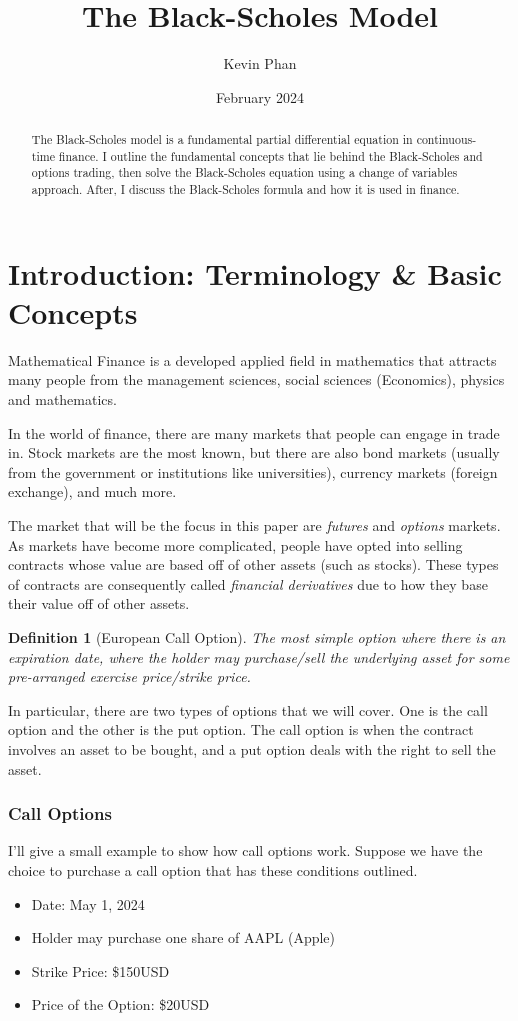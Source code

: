 \documentclass{article}
\title{The Black-Scholes Model}
\author{Kevin Phan}
\date{February 2024}
\newtheorem{definition}{Definition}[section]
\begin{document}
\maketitle

\begin{abstract}
    The Black-Scholes model is a fundamental partial differential equation in 
    continuous-time finance. I outline the fundamental concepts that lie behind the Black-Scholes and options trading, 
    then solve the Black-Scholes equation using a change of variables approach.
    After, I discuss the Black-Scholes formula and how it is used in finance. 
\end{abstract}

\section{Introduction: Terminology \& Basic Concepts}

Mathematical Finance is a developed applied field in mathematics that attracts many people from the management sciences, social sciences (Economics), physics and mathematics.

In the world of finance, there are many markets that people can engage in trade in. Stock markets are the most known, 
but there are also bond markets (usually from the government or institutions like universities), currency markets (foreign exchange), and much more. 

The market that will be the focus in this paper are \emph{futures} and \emph{options} markets. As markets have become more complicated, people have 
opted into selling contracts whose value are based off of other assets (such as stocks). These types of contracts are consequently called \emph{financial derivatives}
due to how they base their value off of other assets. 

\begin{definition}[European Call Option]
The most simple option where there is an expiration date, 
where the holder may purchase/sell the underlying asset for some pre-arranged exercise price/strike price.
\end{definition}
In particular, there are two types of options that we will cover. One is the call option and the other is the put option. The call option is when the contract involves an asset to be bought,
and a put option deals with the right to sell the asset. \cite{wilmott_mathematics_1995}

\subsubsection*{Call Options}
I'll give a small example to show how call options work. 
Suppose we have the choice to purchase a call option that has these conditions outlined.
\begin{itemize}
\item Date: May 1, 2024 
\item Holder may purchase one share of AAPL (Apple)
\item Strike Price: \$150USD
\item Price of the Option: \$20USD
\end{itemize}
\end{document}
